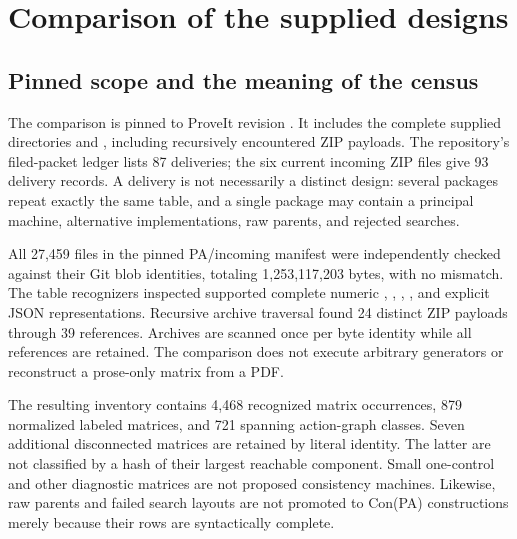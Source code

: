 \section{Comparison of the supplied designs}
\label{sec:comparison}

\subsection{Pinned scope and the meaning of the census}

The comparison is pinned to ProveIt revision
 \cite{pinned}.
It includes the complete supplied directories
 and ,
including recursively encountered ZIP payloads. The repository's filed-packet
ledger lists 87 deliveries; the six current incoming ZIP files give 93 delivery
records. A delivery is not necessarily a distinct design: several packages
repeat exactly the same table, and a single package may contain a principal
machine, alternative implementations, raw parents, and rejected searches.

All 27,459 files in the pinned PA/incoming manifest were independently checked
against their Git blob identities, totaling 1,253,117,203 bytes, with no
mismatch. The table recognizers inspected supported complete numeric
, , , , and explicit JSON
representations. Recursive archive traversal found 24 distinct ZIP payloads
through 39 references. Archives are scanned once per byte identity while all
references are retained. The comparison does not execute arbitrary generators
or reconstruct a prose-only matrix from a PDF.

The resulting inventory contains 4,468 recognized matrix occurrences, 879
normalized labeled matrices, and 721 spanning action-graph classes. Seven
additional disconnected matrices are retained by literal identity. The latter
are not classified by a hash of their largest reachable component. Small
one-control and other diagnostic matrices are not proposed consistency
machines. Likewise, raw parents and failed search layouts are not promoted to
Con(PA) constructions merely because their rows are syntactically complete.

